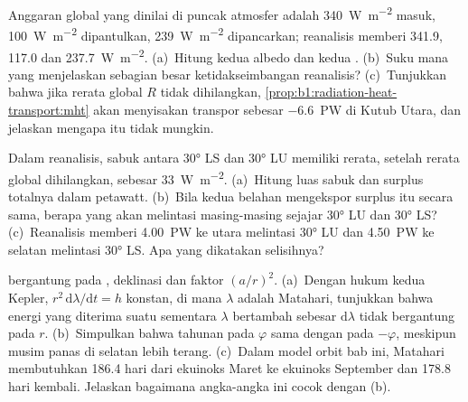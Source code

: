 \begin{exercise}[$\star\star$]\label{exo:b1:radiation-heat-transport:8}
Anggaran global yang dinilai di puncak atmosfer adalah \qty{340}{W.m^{-2}} masuk, \qty{100}{W.m^{-2}} dipantulkan, \qty{239}{W.m^{-2}} dipancarkan; reanalisis memberi \qty{341.9}{}, \qty{117.0}{} dan \qty{237.7}{W.m^{-2}}. (a)~Hitung kedua albedo dan kedua . (b)~Suku mana yang menjelaskan sebagian besar ketidakseimbangan reanalisis? (c)~Tunjukkan bahwa jika rerata global $R$ tidak dihilangkan, \cref{prop:b1:radiation-heat-transport:mht} akan menyisakan transpor sebesar \qty{-6.6}{PW} di Kutub Utara, dan jelaskan mengapa itu tidak mungkin.
\end{exercise}

\begin{exercise}[$\star\star$]\label{exo:b1:radiation-heat-transport:9}
Dalam reanalisis, sabuk antara \ang{30} LS dan \ang{30} LU memiliki  rerata, setelah rerata global dihilangkan, sebesar \qty{+33}{W.m^{-2}}. (a)~Hitung luas sabuk dan surplus totalnya dalam petawatt. (b)~Bila kedua belahan mengekspor surplus itu secara sama, berapa yang akan melintasi masing-masing sejajar \ang{30} LU dan \ang{30} LS? (c)~Reanalisis memberi \qty{4.00}{PW} ke utara melintasi \ang{30} LU dan \qty{4.50}{PW} ke selatan melintasi \ang{30} LS. Apa yang dikatakan selisihnya?
\end{exercise}

\begin{exercise}[$\star\star\star$]\label{exo:b1:radiation-heat-transport:10}
 bergantung pada , deklinasi dan faktor $(a/r)^2$. (a)~Dengan hukum kedua Kepler, $r^2\,\mathrm d\lambda/\mathrm dt = h$ konstan, di mana $\lambda$ adalah   Matahari, tunjukkan bahwa energi yang diterima suatu  sementara $\lambda$ bertambah sebesar $\mathrm d\lambda$ tidak bergantung pada $r$. (b)~Simpulkan bahwa  tahunan pada  $\varphi$ sama dengan pada $-\varphi$, meskipun musim panas di selatan lebih terang. (c)~Dalam model orbit bab ini, Matahari membutuhkan \num{186.4} hari dari ekuinoks Maret ke ekuinoks September dan \num{178.8} hari kembali. Jelaskan bagaimana angka-angka ini cocok dengan (b).
\end{exercise}


